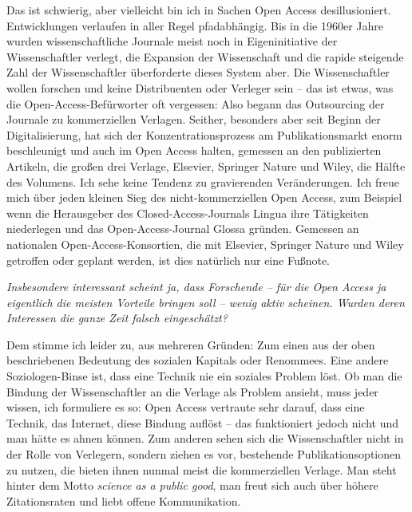 \documentclass[a4paper,
fontsize=11pt,
oneside,
numbers=noperiodatend,
parskip=half-,
bibliography=totoc,
final
]{scrartcl}
\begin{document}
Das ist schwierig, aber vielleicht bin ich in Sachen Open Access
desillusioniert. Entwicklungen verlaufen in aller Regel pfadabhängig.
Bis in die 1960er Jahre wurden wissenschaftliche Journale meist noch in
Eigeninitiative der Wissenschaftler verlegt, die Expansion der
Wissenschaft und die rapide steigende Zahl der Wissenschaftler
überforderte dieses System aber. Die Wissenschaftler wollen forschen und
keine Distribuenten oder Verleger sein -- das ist etwas, was die
Open-Access-Befürworter oft vergessen: Also begann das Outsourcing der
Journale zu kommerziellen Verlagen. Seither, besonders aber seit Beginn
der Digitalisierung, hat sich der Konzentrationsprozess am
Publikationsmarkt enorm beschleunigt und auch im Open Access halten,
gemessen an den publizierten Artikeln, die großen drei Verlage,
Elsevier, Springer Nature und Wiley, die Hälfte des Volumens. Ich sehe
keine Tendenz zu gravierenden Veränderungen. Ich freue mich über jeden
kleinen Sieg des nicht-kommerziellen Open Access, zum Beispiel wenn die
Herausgeber des Closed-Access-Journals Lingua ihre Tätigkeiten
niederlegen und das Open-Access-Journal Glossa gründen. Gemessen an
nationalen Open-Access-Konsortien, die mit Elsevier, Springer Nature und
Wiley getroffen oder geplant werden, ist dies natürlich nur eine
Fußnote.

\emph{Insbesondere interessant scheint ja, dass Forschende -- für die
Open Access ja eigentlich die meisten Vorteile bringen soll -- wenig
aktiv scheinen. Wurden deren Interessen die ganze Zeit falsch
eingeschätzt?}

Dem stimme ich leider zu, aus mehreren Gründen: Zum einen aus der oben
beschriebenen Bedeutung des sozialen Kapitals oder Renommees. Eine
andere Soziologen-Binse ist, dass eine Technik nie ein soziales Problem
löst. Ob man die Bindung der Wissenschaftler an die Verlage als Problem
ansieht, muss jeder wissen, ich formuliere es so: Open Access vertraute
sehr darauf, dass eine Technik, das Internet, diese Bindung auflöst --
das funktioniert jedoch nicht und man hätte es ahnen können. Zum anderen
sehen sich die Wissenschaftler nicht in der Rolle von Verlegern, sondern
ziehen es vor, bestehende Publikationsoptionen zu nutzen, die bieten
ihnen nunmal meist die kommerziellen Verlage. Man steht hinter dem Motto
\emph{science as a public good}, man freut sich auch über höhere
Zitationsraten und liebt offene Kommunikation.
\end{document}

